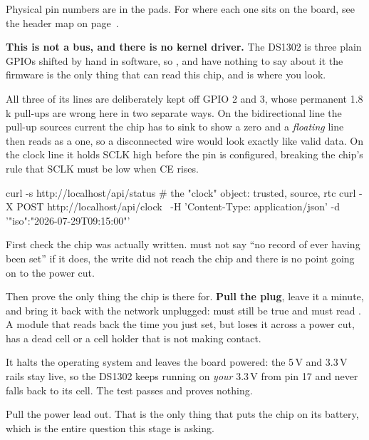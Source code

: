 \documentclass[11pt,a4paper]{article}
\begin{document}
\vspace{-1mm}
\begin{center}\footnotesize\color{ink40}\sffamily
Physical pin numbers are in the pads. For where each one sits on the board, see
the header map on page~\pageref{sec:header}.
\end{center}

\begin{notebox}
\textbf{\sffamily This is not a bus, and there is no kernel driver.} The DS1302
is three plain GPIOs shifted by hand in software, so ,
 and  have nothing to say about it \textemdash{}
the firmware is the only thing that can read this chip, and 
is where you look.

\vspace{1ex}
All three of its lines are deliberately kept off GPIO 2 and 3, whose permanent
1.8\,k\textohm{} pull-ups are wrong here in two separate ways. On the
bidirectional  line the pull-up sources current the chip has to sink
to show a zero \textemdash{} and a \emph{floating} line then reads as a one, so
a disconnected wire would look exactly like valid data. On the clock line it
holds SCLK high before the pin is configured, breaking the chip's rule that SCLK
must be low when CE rises.
\end{notebox}

\begin{provebox}
\provetitle
\begin{shell}
curl -s http://localhost/api/status     # the "clock" object: trusted, source, rtc
curl -X POST http://localhost/api/clock \
     -H 'Content-Type: application/json' -d '{"iso":"2026-07-29T09:15:00"}'
\end{shell}
First check the chip was actually written.  must not say
``no record of ever having been set'' \textemdash{} if it does, the write did
not reach the chip and there is no point going on to the power cut.

\vspace{1ex}
Then prove the only thing the chip is there for. \textbf{Pull the plug}, leave
it a minute, and bring it back with the network unplugged: \code{trusted} must
still be true and \code{source} must read \code{rtc}. A module that reads back
the time you just set, but loses it across a power cut, has a dead cell or a
cell holder that is not making contact.
\end{provebox}

\begin{warnbox}
It halts the operating system and leaves the board powered: the 5\,V and 3.3\,V
rails stay live, so the DS1302 keeps running on \emph{your} 3.3\,V from pin 17
and never falls back to its cell. The test passes and proves nothing.

\vspace{1ex}
Pull the power lead out. That is the only thing that puts the chip on its
battery, which is the entire question this stage is asking.
\end{warnbox}
\end{document}
